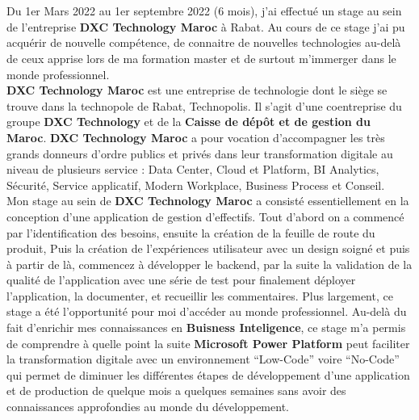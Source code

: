 \titlespacing*{\chapter}{0pt}{0in}{0.3in}
\chapter*{}
\titlespacing*{\chapter}{0pt}{0.45in}{0.3in}%

Du 1er Mars 2022 au 1er septembre 2022 (6 mois), j’ai effectué un stage au sein de l’entreprise \textbf{DXC Technology Maroc} à Rabat. Au cours de ce stage j'ai pu acquérir de nouvelle compétence, de connaitre de nouvelles technologies au-delà de ceux apprise lors de ma formation master et de surtout m'immerger dans le monde professionnel. \\ 

\textbf{DXC Technology Maroc} est une entreprise de technologie dont le siège se trouve dans la technopole de Rabat, Technopolis. Il s’agit d’une coentreprise du groupe \textbf{DXC Technology} et de la \textbf{Caisse de dépôt et de gestion du Maroc}. \textbf{DXC Technology Maroc} a pour vocation d’accompagner les très grands donneurs d’ordre publics et privés dans leur transformation digitale au niveau de plusieurs service : Data Center, Cloud et Platform, BI Analytics, Sécurité, Service applicatif, Modern Workplace, Business Process et Conseil.\\ 

Mon stage au sein de \textbf{DXC Technology Maroc} a consisté essentiellement en la conception d'une application de gestion d'effectifs. Tout d'abord on a commencé par l'identification des besoins, ensuite la création de la feuille de route du produit, Puis la création de l'expériences utilisateur avec un design soigné et puis à partir de là, commencez à développer le backend, par la suite la validation de la qualité de l'application avec une série de test pour finalement déployer l'application, la documenter, et recueillir les commentaires. Plus largement, ce stage a été l’opportunité pour moi d'accéder au monde professionnel. Au-delà du fait d’enrichir mes connaissances en \textbf{Buisness Inteligence}, ce stage m’a permis de comprendre à quelle point la suite \textbf{Microsoft Power Platform} peut faciliter la transformation digitale avec un environnement “Low-Code” voire “No-Code” qui permet de diminuer les différentes étapes de développement d'une application et de production de quelque mois a quelques semaines sans avoir des connaissances approfondies au monde du développement.\\

